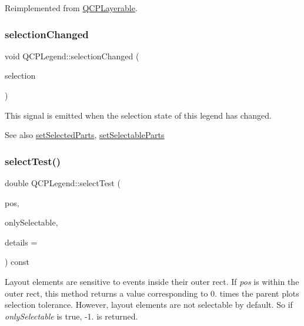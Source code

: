 Reimplemented from \mbox{\hyperlink{class_q_c_p_layerable_a908c9edda761886f33893be326dab77d}{Q\+C\+P\+Layerable}}.

\mbox{\label{class_q_c_p_legend_a82c88464edac07a9eefaf3906268df3b}} 
\subsubsection{\texorpdfstring{selectionChanged}{selectionChanged}}
{\footnotesize\ttfamily void Q\+C\+P\+Legend\+::selection\+Changed (\begin{DoxyParamCaption}\item[{Q\+C\+P\+Legend\+::\+Selectable\+Parts}]{selection }\end{DoxyParamCaption})\hspace{0.3cm}{\ttfamily [signal]}}

This signal is emitted when the selection state of this legend has changed.

\begin{DoxySeeAlso}{See also}
\mbox{\hyperlink{class_q_c_p_legend_a2aee309bb5c2a794b1987f3fc97f8ad8}{set\+Selected\+Parts}}, \mbox{\hyperlink{class_q_c_p_legend_a9ce60aa8bbd89f62ae4fa83ac6c60110}{set\+Selectable\+Parts}} 
\end{DoxySeeAlso}
\mbox{\label{class_q_c_p_legend_aa53507624491908fb3d1a514b1fc674e}} 
\subsubsection{\texorpdfstring{selectTest()}{selectTest()}}
{\footnotesize\ttfamily double Q\+C\+P\+Legend\+::select\+Test (\begin{DoxyParamCaption}\item[{const Q\+PointF \&}]{pos,  }\item[{bool}]{only\+Selectable,  }\item[{Q\+Variant $\ast$}]{details = {} }\end{DoxyParamCaption}) const\hspace{0.3cm}{\ttfamily [virtual]}}

Layout elements are sensitive to events inside their outer rect. If {\itshape pos} is within the outer rect, this method returns a value corresponding to 0. times the parent plot\textquotesingle{}s selection tolerance. However, layout elements are not selectable by default. So if {\itshape only\+Selectable} is true, -\/1. is returned.

